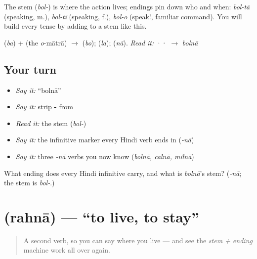 \begin{grammarlens}[title={Grammar Lens: stem + ending}]
The stem \textbf{} (\emph{bol-}) is where the action lives; endings pin down who and when: \emph{bol-tā} (speaking, m.), \emph{bol-tī} (speaking, f.), \emph{bol-o} (speak!, familiar command). You will build every tense by adding to a stem like this.
\end{grammarlens}

\begin{sounds}
 (\emph{ba}) +  (the \emph{o}-mātrā) $\to$  (\emph{bo});  (\emph{la});  (\emph{nā}). \emph{Read it:} ·· $\to$ \emph{bolnā}
\end{sounds}

\subsection*{Your turn}
\begin{itemize}
\raggedright
  \item \emph{Say it:} \textquotedblleft{}bolnā\textquotedblright{}
  \item \emph{Say it:} strip \textbf{-} from \textbf{}
  \item \emph{Read it:} the stem \textbf{} (\emph{bol-})
  \item \emph{Say it:} the infinitive marker every Hindi verb ends in (\emph{-nā})
  \item \emph{Say it:} three \emph{-nā} verbs you now know (\emph{bolnā, calnā, milnā})
\end{itemize}

\begin{tcolorbox}[breakable,colback=teal!4,colframe=teal!35!black,title={Before you move on}]
What ending does every Hindi infinitive carry, and what is \emph{bolnā}'s stem? (\emph{-nā}; the stem is \emph{bol-}.)
\end{tcolorbox}
\section[\texorpdfstring{\hi{रहना} / \hi{रहता} / \hi{में} (rahnā / rahtā / meṁ)}{रहना / रहता / में (rahnā / rahtā / meṁ)}]{ (rahnā) — \textquotedblleft{}to live, to stay\textquotedblright{}}

\label{lesson:HI-C05-rahna}



\begin{quote}
A second verb, so you can say where you live — and see the \emph{stem + ending} machine work all over again.
\end{quote}

